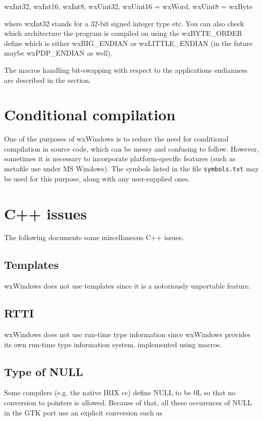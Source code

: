 wxInt32, wxInt16, wxInt8, wxUint32, wxUint16 = wxWord, wxUint8 = wxByte

where wxInt32 stands for a 32-bit signed integer type etc. You can also check
which architecture the program is compiled on using the wxBYTE\_ORDER define
which is either wxBIG\_ENDIAN or wxLITTLE\_ENDIAN (in the future maybe wxPDP\_ENDIAN
as well).

The macros handling bit-swapping with respect to the applications endianness
are described in the  section.

\section{Conditional compilation}

One of the purposes of wxWindows is to reduce the need for conditional
compilation in source code, which can be messy and confusing to follow.
However, sometimes it is necessary to incorporate platform-specific
features (such as metafile use under MS Windows). The symbols
listed in the file {\tt symbols.txt} may be used for this purpose,
along with any user-supplied ones.

\section{C++ issues}

The following documents some miscellaneous C++ issues.

\subsection{Templates}

wxWindows does not use templates since it is a notoriously unportable feature.

\subsection{RTTI}

wxWindows does not use run-time type information since wxWindows provides
its own run-time type information system, implemented using macros.

\subsection{Type of NULL}

Some compilers (e.g. the native IRIX cc) define NULL to be 0L so that
no conversion to pointers is allowed. Because of that, all these
occurences of NULL in the GTK port use an explicit conversion such 
as

